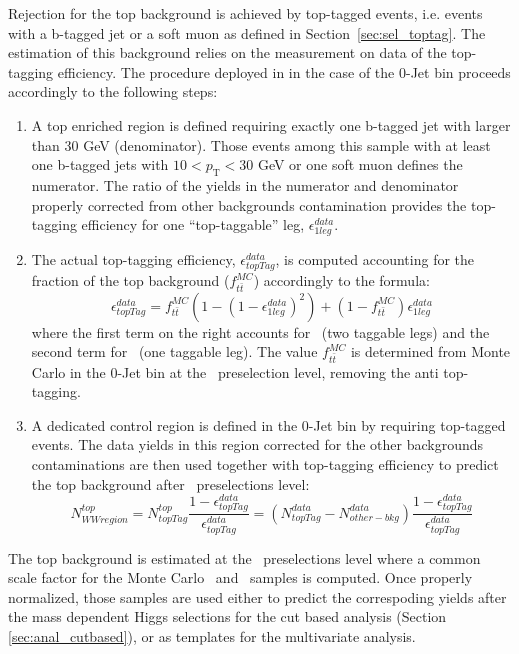 Rejection for the top background is achieved by top-tagged events,
i.e. events with a b-tagged jet or a soft muon as defined in
Section~\ref{sec:sel_toptag}.  The estimation of this background
relies on the measurement on data of the top-tagging efficiency.  The
procedure deployed in \cite{HWW2011} in the case of the 0-Jet bin
proceeds accordingly to the following steps:
\begin{enumerate}
\item 
A top enriched region is defined requiring exactly one b-tagged jet
with \pt larger than $30$ GeV (denominator).  Those events among this
sample with at least one b-tagged jets with
$10<\ensuremath{p_\mathrm{T}}<30$ GeV or one soft muon defines the
numerator. The ratio of the yields in the numerator and denominator
properly corrected from other backgrounds contamination provides the
top-tagging efficiency for one ``top-taggable'' leg,
$\epsilon_{1leg}^{data}$.
\item 
The actual top-tagging efficiency, $\epsilon_{topTag}^{data}$, is
computed accounting for the \ttbar fraction of the top background
($f_{t\bar{t}}^{MC}$) accordingly to the formula:
\begin{equation} \label{eq:oldTopTagEff}
\epsilon_{topTag}^{data} = f_{t\bar{t}}^{MC}(1-(1-\epsilon_{1leg}^{data})^2) + (1-f_{t\bar{t}}^{MC})\epsilon_{1leg}^{data}
\end{equation} 
where the first term on the right accounts for \ttbar\ (two taggable
legs) and the second term for \tw\ (one taggable leg). The value
$f_{t\bar{t}}^{MC}$ is determined from Monte Carlo in the 0-Jet bin at
the \WW\ preselection level, removing the anti top-tagging.
\item 
A dedicated control region is defined in the 0-Jet bin by requiring
top-tagged events.  The data yields in this region corrected for the
other backgrounds contaminations are then used together with
top-tagging efficiency to predict the top background after \WW\
preselections level:
\begin{equation} \label{eq:topExtrapolation}
N^{top}_{WW region}=N_{topTag}^{top}\frac{1-\epsilon_{topTag}^{data}}{\epsilon_{topTag}^{data}} = 
(N_{topTag}^{data}-N_{other-bkg}^{data})\frac{1-\epsilon_{topTag}^{data}}{\epsilon_{topTag}^{data}}
\end{equation} 
\end{enumerate} 

The top background is estimated at the \WW\ preselections level where
a common scale factor for the Monte Carlo \ttbar\ and \tw\ samples is
computed.  Once properly normalized, those samples are used either to
predict the correspoding yields after the mass dependent Higgs
selections for the cut based analysis
(Section \ref{sec:anal_cutbased}), or as templates for the
multivariate analysis.

